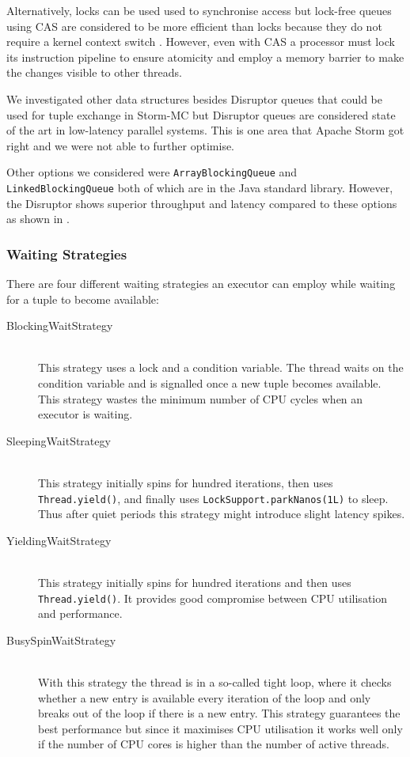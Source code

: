 \documentclass[bsc,deptreport,twoside,singlespacing,normalheadings,parskip]{infthesis}\usepackage[]{graphicx}\usepackage[]{color}
\begin{document}
Alternatively, locks can be used used to synchronise access but lock-free queues using CAS are considered to be more efficient than locks because they do not require a kernel context switch \cite{Thompson_Farley_Barker_Gee_Stewart_2011}. However, even with CAS a processor must lock its instruction pipeline to ensure atomicity and employ a memory barrier to make the changes visible to other threads.

We investigated other data structures besides Disruptor queues that could be used for tuple exchange in Storm-MC but Disruptor queues are considered state of the art in low-latency parallel systems. This is one area that Apache Storm got right and we were not able to further optimise.

Other options we considered were \texttt{ArrayBlockingQueue} and \texttt{LinkedBlockingQueue} both of which are in the Java standard library. However, the Disruptor shows superior throughput and latency compared to these options as shown in \citep{DisruptorWiki}.

\subsubsection{Waiting Strategies}
\label{subsubsec:waiting}

There are four different waiting strategies an executor can employ while waiting for a tuple to become available:

\begin{description}
	\item[BlockingWaitStrategy] \hfill \\
	This strategy uses a lock and a condition variable. The thread waits on the condition variable and is signalled once a new tuple becomes available. This strategy wastes the minimum number of CPU cycles when an executor is waiting.
	\item[SleepingWaitStrategy] \hfill \\
	This strategy initially spins for hundred iterations, then uses \texttt{Thread.yield()}, and finally uses \texttt{LockSupport.parkNanos(1L)} to sleep. Thus after quiet periods this strategy might introduce slight latency spikes.
	\item[YieldingWaitStrategy] \hfill \\
	This strategy initially spins for hundred iterations and then uses \texttt{Thread.yield()}. It provides good compromise between CPU utilisation and performance.
	\item[BusySpinWaitStrategy] \hfill \\
	With this strategy the thread is in a so-called tight loop, where it checks whether a new entry is available every iteration of the loop and only breaks out of the loop if there is a new entry. This strategy guarantees the best performance but since it maximises CPU utilisation it works well only if the number of CPU cores is higher than the number of active threads.
\end{description}
\end{document}
